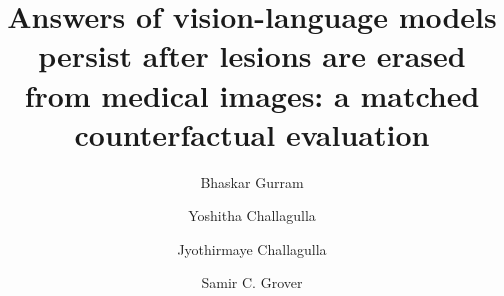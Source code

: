 \begin{frontmatter}

\title{Answers of vision-language models persist after lesions are erased from medical images: a matched counterfactual evaluation}

\author[ind]{Bhaskar Gurram}
\author[ind]{Yoshitha Challagulla}
\author[jc]{Jyothirmaye Challagulla}
\author[shn,uoft]{Samir C. Grover}
\address[ind]{Independent Researcher, }
\address[jc]{}
\address[shn]{Scarborough Health Network Research Institute, Toronto, Ontario, Canada}
\address[uoft]{Department of Medicine, University of Toronto, Toronto, Ontario, Canada}


\end{frontmatter}
